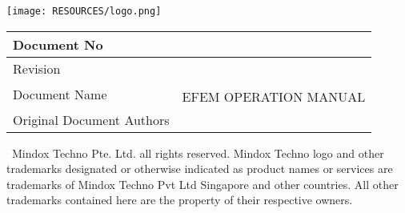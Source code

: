 \begin{titlepage}
\thispagestyle{fancy}
	\centering	
	\texttt{[image: RESOURCES/logo.png]}\par
	\vspace{2.0cm} %
			
	\begin{center} %
		\begin{tabularx}{\textwidth} {|p{6cm}|X| }
			\hline
			Document No & \DocumentNumber \;\\
			\hline
			Revision  & \DocumentRevision  \\
			\hline
			\multirow{2}{*}{Document Name} &  \EFEMMachine \; \\
			  			                          &  EFEM OPERATION MANUAL  \\
              \hline
			\multirow{3}{*}{Original Document Authors}  &  \\%
      		\hline
		\end{tabularx}
	\end{center}		
	\vspace{2.5cm}
	\begin{center}
		\setlength{\fboxrule}{1pt}
	\end{center}
	\textit{}
	\begin{center}
		\justify
		\begin{footnotesize}
			\singlespacing
			\textcopyright\ \Year \;Mindox Techno Pte. Ltd. all rights reserved. Mindox Techno logo and other trademarks designated or otherwise indicated as product names or services are trademarks of Mindox Techno Pvt Ltd Singapore and other countries. All other trademarks contained here are the property of their respective owners. \\
		\end{footnotesize}
	\end{center}	
	\vfill
\end{titlepage}